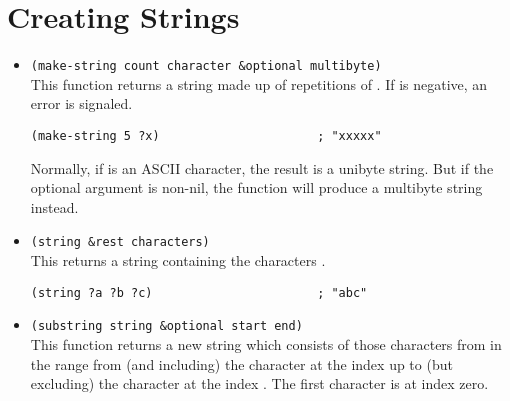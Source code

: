 \section{Creating Strings}
\label{sec:creating-strings}

\begin{itemize}[itemsep=10pt]
\item \lstinline|(make-string count character &optional multibyte)|\\
  This function returns a string made up of  repetitions of .
  If  is negative, an error is signaled.
\begin{lstlisting}
(make-string 5 ?x)                      ; "xxxxx"
\end{lstlisting}
  Normally, if  is an ASCII character, the result is a unibyte string.
  But if the optional argument  is non-nil, the function will produce a multibyte string instead. 
\item \lstinline|(string &rest characters)|\\
  This returns a string containing the characters .
\begin{lstlisting}
(string ?a ?b ?c)                       ; "abc"
\end{lstlisting}
\item \lstinline|(substring string &optional start end)|\\
  This function returns a new string which consists of those characters from  in the range from (and including) the character at the index  up to (but excluding) the character at the index .
  The first character is at index zero.


\end{itemize}
